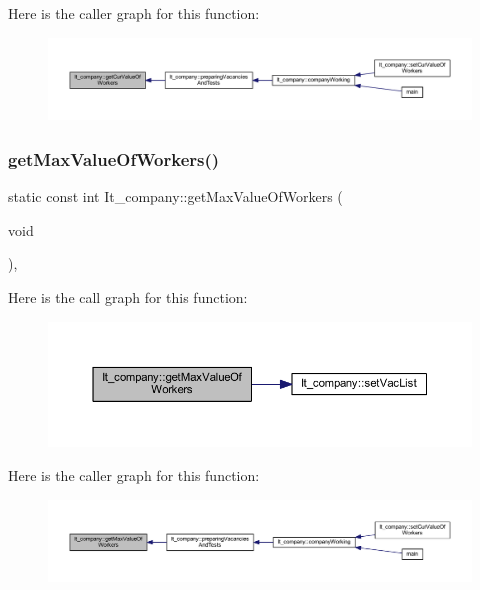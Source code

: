 Here is the caller graph for this function\+:
\nopagebreak
\begin{figure}[H]
\begin{center}
\leavevmode
\includegraphics[width=350pt]{class_it__company_aadb84a911a10ad83f6e9a84558a1d4df_icgraph}
\end{center}
\end{figure}
\hypertarget{class_it__company_a11e4104cfd2c51f89f9d10b290c8eaaa}{}\label{class_it__company_a11e4104cfd2c51f89f9d10b290c8eaaa} 
\subsubsection{\texorpdfstring{get\+Max\+Value\+Of\+Workers()}{getMaxValueOfWorkers()}}
{\footnotesize\ttfamily static const int It\+\_\+company\+::get\+Max\+Value\+Of\+Workers (\begin{DoxyParamCaption}\item[{void}]{ }\end{DoxyParamCaption})\hspace{0.3cm}{\ttfamily [inline]}, {\ttfamily [static]}}

Here is the call graph for this function\+:
\nopagebreak
\begin{figure}[H]
\begin{center}
\leavevmode
\includegraphics[width=350pt]{class_it__company_a11e4104cfd2c51f89f9d10b290c8eaaa_cgraph}
\end{center}
\end{figure}
Here is the caller graph for this function\+:
\nopagebreak
\begin{figure}[H]
\begin{center}
\leavevmode
\includegraphics[width=350pt]{class_it__company_a11e4104cfd2c51f89f9d10b290c8eaaa_icgraph}
\end{center}
\end{figure}
\hypertarget{class_it__company_a83fff670c4a7271486f9632db1bf4d77}{}\label{class_it__company_a83fff670c4a7271486f9632db1bf4d77} 
